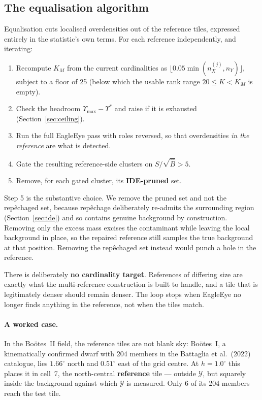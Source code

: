 \documentclass[11pt,a4paper]{article}
\newcommand{\Ycal}{\mathcal{Y}}              %
\newcommand{\Ups}{\Upsilon}                  %
\newcommand{\Ups}{\Upsilon}
\newcommand{\Bhat}{\hat{B}}
\newcommand{\srb}{S/\sqrt{\Bhat}}
\newcommand{\Ycal}{\mathcal{Y}}
\newcommand{\dg}{^{\circ}}
\begin{document}
\subsection{The equalisation algorithm}
\label{sec:equalise}

Equalisation cuts localised overdensities out of the reference tiles, expressed entirely in the
statistic's own terms. For each reference independently, and iterating:

\begin{enumerate}[nosep,leftmargin=1.4em]
\item Recompute $K_M$ from the current cardinalities as
      $\lfloor 0.05\min(n_X^{(j)}, n_Y)\rfloor$, subject to a floor of 25 (below which the usable
      rank range $20 \le K < K_M$ is empty).
\item Check the headroom $\Ups_{\max} - \Ups^*$ and raise if it is exhausted
      (Section~\ref{sec:ceiling}).
\item Run the full EagleEye pass with roles reversed, so that overdensities \emph{in the
      reference} are what is detected.
\item Gate the resulting reference-side clusters on $\srb > 5$.
\item Remove, for each gated cluster, its \textbf{IDE-pruned} set.
\end{enumerate}

Step 5 is the substantive choice. We remove the pruned set and not the rep\^echaged set, because
rep\^echage deliberately re-admits the surrounding region (Section~\ref{sec:ide}) and so contains
genuine background by construction. Removing only the excess mass excises the contaminant while
leaving the local background in place, so the repaired reference still samples the true background
at that position. Removing the rep\^echaged set instead would punch a hole in the reference.

There is deliberately \textbf{no cardinality target}. References of differing size are exactly what
the multi-reference construction is built to handle, and a tile that is legitimately denser should
remain denser. The loop stops when EagleEye no longer finds anything in the reference, not when the
tiles match.

\paragraph{A worked case.} In the Bo\"otes~II field, the reference tiles are not blank sky:
Bo\"otes~I, a kinematically confirmed dwarf with 204 members in the Battaglia et al.\ (2022)
catalogue, lies $1.66\dg$ north and $0.51\dg$ east of the grid centre. At $h = 1.0\dg$ this places
it in cell~7, the north-central \textbf{reference} tile --- outside $\Ycal$, but squarely inside
the background against which $\Ycal$ is measured. Only 6 of its 204 members reach the test tile.
\end{document}
